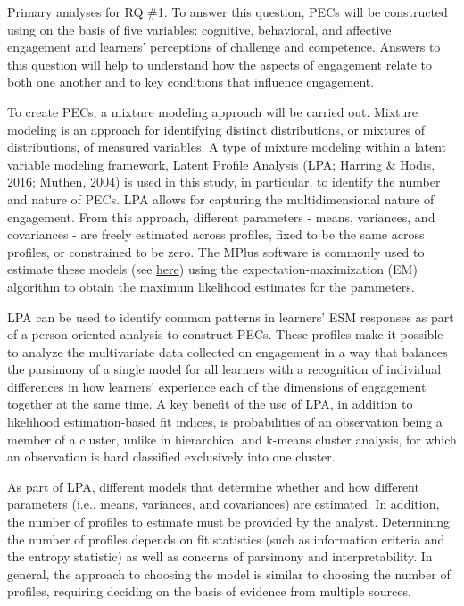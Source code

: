 \documentclass[]{book}
\theoremstyle{definition}
\theoremstyle{definition}
\theoremstyle{definition}
\theoremstyle{remark}
\begin{document}
Primary analyses for RQ \#1. To answer this question, PECs will be
constructed using on the basis of five variables: cognitive, behavioral,
and affective engagement and learners' perceptions of challenge and
competence. Answers to this question will help to understand how the
aspects of engagement relate to both one another and to key conditions
that influence engagement.

To create PECs, a mixture modeling approach will be carried out. Mixture
modeling is an approach for identifying distinct distributions, or
mixtures of distributions, of measured variables. A type of mixture
modeling within a latent variable modeling framework, Latent Profile
Analysis (LPA; Harring \& Hodis, 2016; Muthen, 2004) is used in this
study, in particular, to identify the number and nature of PECs. LPA
allows for capturing the multidimensional nature of engagement. From
this approach, different parameters - means, variances, and covariances
- are freely estimated across profiles, fixed to be the same across
profiles, or constrained to be zero. The MPlus software is commonly used
to estimate these models (see
\href{https://www.statmodel.com/examples/mixture.shtml}{here}) using the
expectation-maximization (EM) algorithm to obtain the maximum likelihood
estimates for the parameters.

LPA can be used to identify common patterns in learners' ESM responses
as part of a person-oriented analysis to construct PECs. These profiles
make it possible to analyze the multivariate data collected on
engagement in a way that balances the parsimony of a single model for
all learners with a recognition of individual differences in how
learners' experience each of the dimensions of engagement together at
the same time. A key benefit of the use of LPA, in addition to
likelihood estimation-based fit indices, is probabilities of an
observation being a member of a cluster, unlike in hierarchical and
k-means cluster analysis, for which an observation is hard classified
exclusively into one cluster.

As part of LPA, different models that determine whether and how
different parameters (i.e., means, variances, and covariances) are
estimated. In addition, the number of profiles to estimate must be
provided by the analyst. Determining the number of profiles depends on
fit statistics (such as information criteria and the entropy statistic)
as well as concerns of parsimony and interpretability. In general, the
approach to choosing the model is similar to choosing the number of
profiles, requiring deciding on the basis of evidence from multiple
sources.
\end{document}
